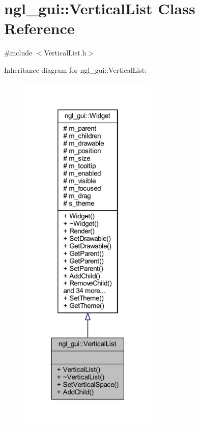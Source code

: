 \hypertarget{classngl__gui_1_1_vertical_list}{}\section{ngl\+\_\+gui\+:\+:Vertical\+List Class Reference}
\label{classngl__gui_1_1_vertical_list}


{\ttfamily \#include $<$Vertical\+List.\+h$>$}



Inheritance diagram for ngl\+\_\+gui\+:\+:Vertical\+List\+:\nopagebreak
\begin{figure}[H]
\begin{center}
\leavevmode
\includegraphics[width=187pt]{classngl__gui_1_1_vertical_list__inherit__graph}
\end{center}
\end{figure}


